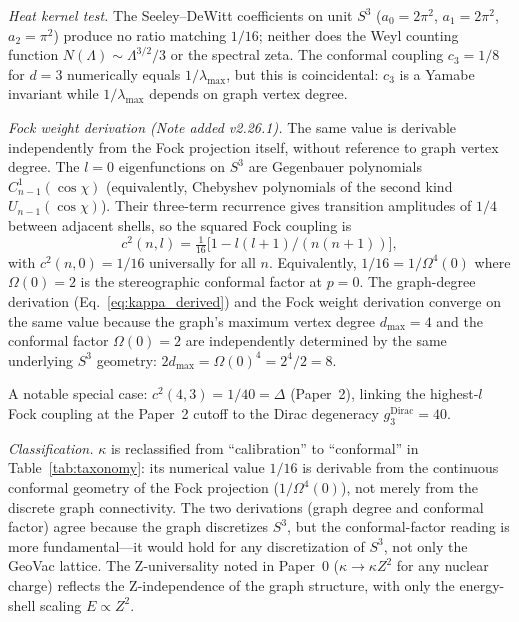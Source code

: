 \documentclass[aps,pra,twocolumn,superscriptaddress,longbibliography]{revtex4-2}
\begin{document}
\textit{Heat kernel test.}  The Seeley--DeWitt coefficients on unit
$S^3$ ($a_0 = 2\pi^2$, $a_1 = 2\pi^2$, $a_2 = \pi^2$) produce no
ratio matching $1/16$; neither does the Weyl counting function
$N(\Lambda) \sim \Lambda^{3/2}/3$ or the spectral zeta.  The conformal
coupling $c_3 = 1/8$ for $d=3$ numerically equals $1/\lambda_{\max}$,
but this is coincidental: $c_3$ is a Yamabe invariant while
$1/\lambda_{\max}$ depends on graph vertex degree.

\textit{Fock weight derivation (Note added v2.26.1).}  The same value
is derivable independently from the Fock projection itself, without
reference to graph vertex degree.  The $l = 0$ eigenfunctions on $S^3$
are Gegenbauer polynomials $C^1_{n-1}(\cos\chi)$ (equivalently,
Chebyshev polynomials of the second kind $U_{n-1}(\cos\chi)$).  Their
three-term recurrence gives transition amplitudes of $1/4$ between
adjacent shells, so the squared Fock coupling is
\begin{equation}
  c^2(n,l) = \tfrac{1}{16}\bigl[1 - l(l{+}1)/(n(n{+}1))\bigr],
  \label{eq:fock_coupling_p18}
\end{equation}
with $c^2(n,0) = 1/16$ universally for all $n$.  Equivalently,
$1/16 = 1/\Omega^4(0)$ where $\Omega(0) = 2$ is the stereographic
conformal factor at $p = 0$.  The graph-degree derivation
(Eq.~\ref{eq:kappa_derived}) and the Fock weight derivation converge
on the same value because the graph's maximum vertex degree
$d_{\max} = 4$ and the conformal factor $\Omega(0) = 2$ are
independently determined by the same underlying $S^3$ geometry:
$2 d_{\max} = \Omega(0)^4 = 2^4/2 = 8$.

A notable special case: $c^2(4,3) = 1/40 = \Delta$ (Paper~2), linking
the highest-$l$ Fock coupling at the Paper~2 cutoff to the Dirac
degeneracy $g_3^{\mathrm{Dirac}} = 40$.

\textit{Classification.}  $\kappa$ is reclassified from ``calibration''
to ``conformal'' in Table~\ref{tab:taxonomy}: its numerical value
$1/16$ is derivable from the continuous conformal geometry of the Fock
projection ($1/\Omega^4(0)$), not merely from the discrete graph
connectivity.  The two derivations (graph degree and conformal factor)
agree because the graph discretizes $S^3$, but the conformal-factor
reading is more fundamental---it would hold for any discretization of
$S^3$, not only the GeoVac lattice.  The Z-universality noted in
Paper~0 ($\kappa \to \kappa Z^2$ for any nuclear charge)
reflects the Z-independence of the graph structure, with only
the energy-shell scaling $E \propto Z^2$.
\end{document}
